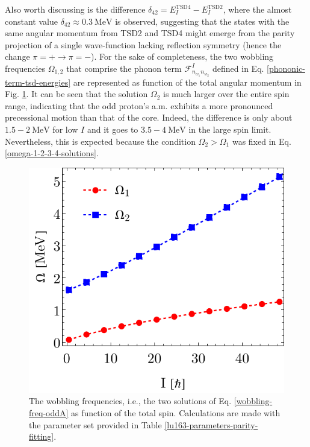 Also worth discussing is the difference $\delta_{42}=E_I^\text{TSD4}-E_I^\text{TSD2}$, where the almost constant value $\delta_{42}\approx 0.3\ \text{MeV}$ is observed, suggesting that the states with the same angular momentum from TSD2 and TSD4 might emerge from the parity projection of a single wave-function lacking reflection symmetry (hence the change $\pi=+\to\pi=-$). For the sake of completeness, the two wobbling frequencies $\Omega_{1,2}$ that comprise the phonon term $\mathcal{F}^I_{n_{w_1}n_{w_2}}$ defined in Eq. \ref{phononic-term-tsd-energies} are represented as function of the total angular momentum in Fig. \ref{lu163-wobbling-frequencies-parity}. It can be seen that the solution $\Omega_2$ is much larger over the entire spin range, indicating that the odd proton's a.m. exhibits a more pronounced precessional motion than that of the core. Indeed, the difference is only about $1.5-2\ \text{MeV}$ for low $I$ and it goes to $3.5-4\ \text{MeV}$ in the large spin limit. Nevertheless, this is expected because the condition $\Omega_2>\Omega_1$ was fixed in Eq. \ref{omega-1-2-3-4-solutions}.
\begin{figure}
    \centering
    \includegraphics[scale=0.85]{Chapters/Figures/parity-partners-plots/wobblingFrequency.pdf}
    \caption{The wobbling frequencies, i.e., the two solutions of Eq. \ref{wobbling-freq-oddA} as function of the total spin. Calculations are made with the parameter set provided in Table \ref{lu163-parameters-parity-fitting}.}
    \label{lu163-wobbling-frequencies-parity}
\end{figure}

